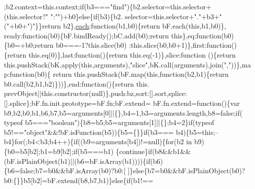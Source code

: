 \begin{DoxyCode}
      ;b2.context=this.context;\textcolor{keywordflow}{if}(b3===\textcolor{stringliteral}{"find"})\{b2.selector=this.selector+(this.selector?\textcolor{stringliteral}{" "}:\textcolor{stringliteral}{""})+b0\}\textcolor{keywordflow}{else}\{\textcolor{keywordflow}{if}(b3)\{b2.
      selector=this.selector+\textcolor{stringliteral}{"."}+b3+\textcolor{stringliteral}{"("}+b0+\textcolor{stringliteral}{")"}\}\}\textcolor{keywordflow}{return} b2\},\hyperlink{a00039_a871ff39db627c54c710a3e9909b8234c}{each}:\textcolor{keyword}{function}(b1,b0)\{\textcolor{keywordflow}{return} bF.each(\textcolor{keyword}{this},b1,b0)\},
      ready:\textcolor{keyword}{function}(b0)\{bF.bindReady();bC.add(b0);\textcolor{keywordflow}{return} \textcolor{keyword}{this}\},eq:\textcolor{keyword}{function}(b0)\{b0=+b0;\textcolor{keywordflow}{return} b0===-1?this.slice(b0)
      :this.slice(b0,b0+1)\},first:function()\{\textcolor{keywordflow}{return} this.eq(0)\},last:\textcolor{keyword}{function}()\{\textcolor{keywordflow}{return} this.eq(-1)\},slice:\textcolor{keyword}{function}
      ()\{\textcolor{keywordflow}{return} this.pushStack(bK.apply(\textcolor{keyword}{this},arguments),\textcolor{stringliteral}{"slice"},bK.call(arguments).join(\textcolor{stringliteral}{","}))\},map:\textcolor{keyword}{function}(b0)\{\textcolor{keywordflow}{
      return} this.pushStack(bF.map(\textcolor{keyword}{this},\textcolor{keyword}{function}(b2,b1)\{return b0.call(b2,b1,b2)\}))\},end:\textcolor{keyword}{function}()\{\textcolor{keywordflow}{return} this.
      prevObject||this.constructor(null)\},push:bz,sort:[].sort,splice:[].splice\};bF.fn.init.prototype=bF.fn;bF.extend=
      bF.fn.extend=\textcolor{keyword}{function}()\{var b9,b2,b0,b1,b6,b7,b5=arguments[0]||\{\},b4=1,b3=arguments.length,b8=\textcolor{keyword}{false};\textcolor{keywordflow}{if}(
      typeof b5===\textcolor{stringliteral}{"boolean"})\{b8=b5;b5=arguments[1]||\{\};b4=2\}\textcolor{keywordflow}{if}(typeof b5!==\textcolor{stringliteral}{"object"}&&!bF.isFunction(b5))\{b5=\{\}\}\textcolor{keywordflow}{if}(b3===
      b4)\{b5=\textcolor{keyword}{this};--b4\}\textcolor{keywordflow}{for}(;b4<b3;b4++)\{\textcolor{keywordflow}{if}((b9=arguments[b4])!=null)\{\textcolor{keywordflow}{for}(b2 in b9)\{b0=b5[b2];b1=b9[b2];\textcolor{keywordflow}{if}(b5===b1)
      \{\textcolor{keywordflow}{continue}\}\textcolor{keywordflow}{if}(b8&&b1&&(bF.isPlainObject(b1)||(b6=bF.isArray(b1))))\{\textcolor{keywordflow}{if}(b6)\{b6=\textcolor{keyword}{false};b7=b0&&bF.isArray(b0)?b0:[
      ]\}\textcolor{keywordflow}{else}\{b7=b0&&bF.isPlainObject(b0)?b0:\{\}\}b5[b2]=bF.extend(b8,b7,b1)\}\textcolor{keywordflow}{else}\{\textcolor{keywordflow}{if}(b1!==

\end{DoxyCode}
